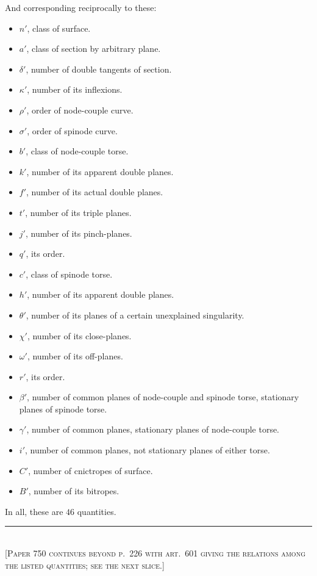 \documentclass[11pt]{article}
\begin{document}
\medskip
\noindent
And corresponding reciprocally to these:

\medskip
\begin{itemize}
\setlength{\itemsep}{1pt}
\item[] $n'$, class of surface.
\item[] $a'$, class of section by arbitrary plane.
\item[] $\delta'$, number of double tangents of section.
\item[] $\kappa'$, number of its inflexions.
\item[] $\rho'$, order of node-couple curve.
\item[] $\sigma'$, order of spinode curve.
\item[] $b'$, class of node-couple torse.
\item[] $k'$, number of its apparent double planes.
\item[] $f'$, number of its actual double planes.
\item[] $t'$, number of its triple planes.
\item[] $j'$, number of its pinch-planes.
\item[] $q'$, its order.
\item[] $c'$, class of spinode torse.
\item[] $h'$, number of its apparent double planes.
\item[] $\theta'$, number of its planes of a certain unexplained singularity.
\item[] $\chi'$, number of its close-planes.
\item[] $\omega'$, number of its off-planes.
\item[] $r'$, its order.
\item[] $\beta'$, number of common planes of node-couple and spinode torse,
   stationary planes of spinode torse.
\item[] $\gamma'$, number of common planes, stationary planes of node-couple torse.
\item[] $i'$, number of common planes, not stationary planes of either torse.
\item[] $C'$, number of cnictropes of surface.
\item[] $B'$, number of its bitropes.
\end{itemize}

\medskip
\noindent
In all, these are $46$ quantities.

\bigskip
\noindent\rule{0.35\textwidth}{0.4pt}\\[2pt]
\footnotesize\textsc{[Paper 750 continues beyond p.\ 226 with art.\ 601
giving the relations among the listed quantities; see the next slice.]}\normalsize
\end{document}

